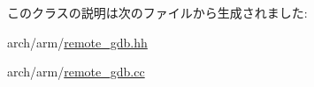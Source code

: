 このクラスの説明は次のファイルから生成されました:\begin{DoxyCompactItemize}
\item 
arch/arm/\hyperlink{arch_2arm_2remote__gdb_8hh}{remote\_\-gdb.hh}\item 
arch/arm/\hyperlink{arch_2arm_2remote__gdb_8cc}{remote\_\-gdb.cc}\end{DoxyCompactItemize}
